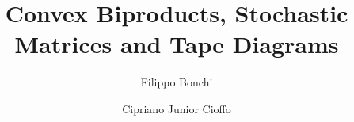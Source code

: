 \documentclass{lmcs}
\begin{document}
\title{Convex Biproducts, Stochastic Matrices and Tape Diagrams}

\author{Filippo Bonchi}
\address{University of Pisa, Pisa, Italy}

\author{Cipriano Junior Cioffo}
\address{University of Pisa, Pisa, Italy}













\maketitle
\end{document}

